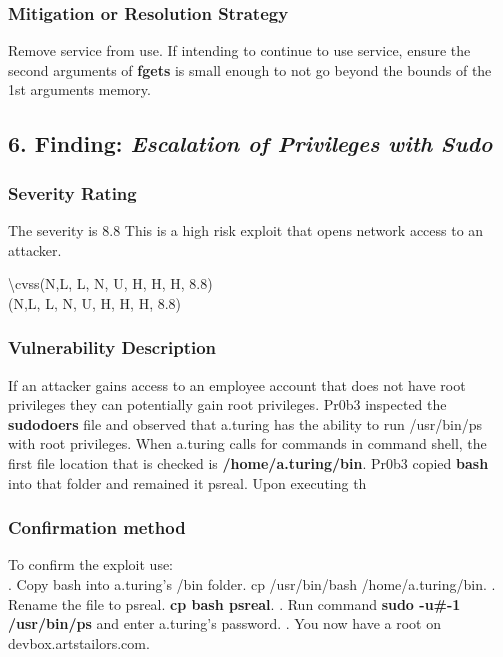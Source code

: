 \documentclass[notitlepage]{article}
\begin{document}
	
	\subsubsection{Mitigation or Resolution Strategy}
	\indent Remove service from use. If intending to continue to use service, ensure the second arguments of \textbf{fgets} is small enough to not go beyond the bounds of the 1st arguments memory. \\
		
		\subsection{6. Finding: \emph{Escalation of Privileges with Sudo}}
	
	\subsubsection{Severity Rating}
	\indent The severity is 8.8 This is a high risk exploit that opens network access to an attacker. 
	
	\textbackslash cvss(N,L, L, N, U, H, H, H, 8.8)\\
	\cvss(N,L, L, N, U, H, H, H, 8.8) \\
	
	\subsubsection{Vulnerability Description}
	\indent If an attacker gains access to an employee account that does not have root privileges they can potentially gain root privileges.  Pr0b3 inspected the \textbf{sudodoers} file and observed that a.turing has the ability to run /usr/bin/ps with root privileges.  When a.turing calls for commands in command shell, the first file location that is checked is \textbf{/home/a.turing/bin}.  Pr0b3 copied \textbf{bash} into that folder and remained it psreal.  Upon executing th
	
	\subsubsection{Confirmation method}
	To confirm the exploit use: \\
	. Copy bash into a.turing's /bin folder. cp /usr/bin/bash /home/a.turing/bin.
	. Rename the file to psreal. \textbf{cp bash psreal}.
	. Run command \textbf{sudo -u\#-1 /usr/bin/ps} and enter a.turing's password.  
	. You now have a root on devbox.artstailors.com.
	
\end{document}
